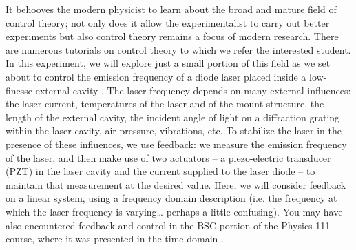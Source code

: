 \documentclass{../lab}
\begin{document}
It behooves the modern physicist to learn about the broad and mature field of control theory; not only does it allow the experimentalist to carry out better experiments but also control theory remains a focus of modern research. There are numerous tutorials on control theory \cite{DiStefano,Dorf,Bechhoefer} to which we refer the interested student. In this experiment, we will explore just a small portion of this field as we set about to control the emission frequency of a diode laser placed inside a low-finesse external cavity \cite{Wieman}. The laser frequency depends on many external influences: the laser current, temperatures of the laser and of the mount structure, the length of the external cavity, the incident angle of light on a diffraction grating within the laser cavity, air pressure, vibrations, etc. To stabilize the laser in the presence of these influences, we use feedback: we measure the emission frequency of the laser, and then make use of two actuators – a piezo-electric transducer (PZT) in the laser cavity and the current supplied to the laser diode – to maintain that measurement at the desired value. Here, we will consider feedback on a linear system, using a frequency domain description (i.e. the frequency at which the laser frequency is varying… perhaps a little confusing). You may have also encountered feedback and control in the BSC portion of the Physics 111 course, where it was presented in the time domain \cite{BSCWriteup}.
\end{document}
